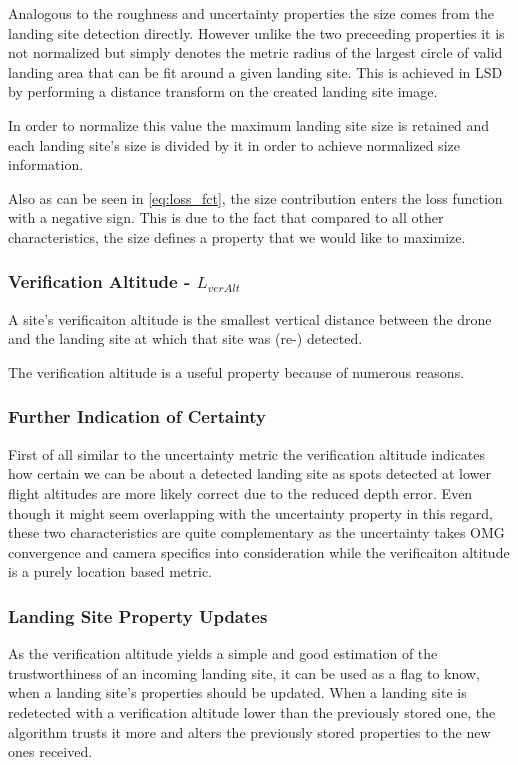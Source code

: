 Analogous to the roughness and uncertainty properties the size comes from the landing site detection directly. However unlike the two preceeding properties it is not normalized but simply denotes the metric radius of the largest circle of valid landing area that can be fit around a given landing site. This is achieved in LSD by performing a distance transform on the created landing site image.

In order to normalize this value the maximum landing site size is retained and each landing site's size is divided by it in order to achieve normalized size information.

Also as can be seen in \cref{eq:loss_fct}, the size contribution enters the loss function with a negative sign. This is due to the fact that compared to all other characteristics, the size defines a property that we would like to maximize.

\subsubsection{Verification Altitude - $L_{verAlt}$}

A site's verificaiton altitude is the smallest vertical distance between the drone and the landing site at which that site was (re-) detected. 

The verification altitude is a useful property because of numerous reasons.
\subsubsection{Further Indication of Certainty}
First of all similar to the uncertainty metric the verification altitude indicates how certain we can be about a detected landing site as spots detected at lower flight altitudes are more likely correct due to the reduced depth error. Even though it might seem overlapping with the uncertainty property in this regard, these two characteristics are quite complementary as the uncertainty takes OMG convergence and camera specifics into consideration while the verificaiton altitude is a purely location based metric.

\subsubsection{Landing Site Property Updates}
As the verification altitude yields a simple and good estimation of the trustworthiness of an incoming landing site, it can be used as a flag to know, when a landing site's properties should be updated. When a landing site is redetected with a verification altitude lower than the previously stored one, the algorithm trusts it more and alters the previously stored properties to the new ones received.

